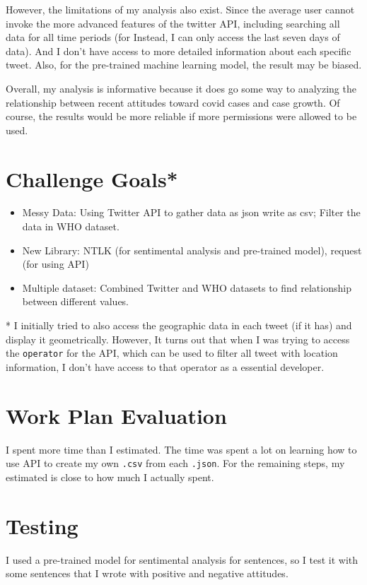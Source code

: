 \documentclass[a4paper, 12pt]{article}
\begin{document}
However, the limitations of my analysis also exist. Since the average user cannot invoke the more advanced features of the twitter API, including searching all data for all time periods (for Instead, I can only access the last seven days of data). And I don't have access to more detailed information about each specific tweet. Also, for the pre-trained machine learning model, the result may be biased.

Overall, my analysis is informative because it does go some way to analyzing the relationship between recent attitudes toward covid cases and case growth. Of course, the results would be more reliable if more permissions were allowed to be used.

\section*{Challenge Goals*}
\begin{itemize}
    \item Messy Data: Using Twitter API to gather data as json write as csv; Filter the data in WHO dataset.
    \item New Library: NTLK (for sentimental analysis and pre-trained model), request (for using API) 
    \item Multiple dataset: Combined Twitter and WHO datasets to find relationship between different values.
\end{itemize}
* I initially tried to also access the geographic data in each tweet (if it has) and display it geometrically. However, It turns out that when I was trying to access the \texttt{operator} for the API, which can be used to filter all tweet with location information, I don't have access to that operator as a essential developer.

\section*{Work Plan Evaluation}
I spent more time than I estimated. The time was spent a lot on learning how to use API to create my own \texttt{.csv} from each \texttt{.json}. For the remaining steps, my estimated is close to how much I actually spent. 

\section*{Testing}
I used a pre-trained model for sentimental analysis for sentences, so I test it with some sentences that I wrote with positive and negative attitudes. 
\end{document}
